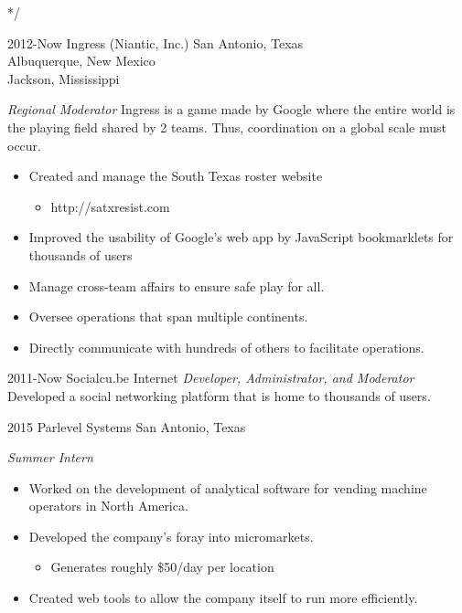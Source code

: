 \documentclass[]{friggeri-cv} %
\begin{document}
*/ 


\begin{entrylist}

\entry
{2012-Now}
{Ingress (Niantic, Inc.)}
{San Antonio, Texas \\ Albuquerque, New Mexico \\ Jackson, Mississippi}
{\emph{Regional Moderator}
Ingress is a game made by Google where the entire world is the playing field shared by 2 teams. Thus, coordination on a global scale must occur. 
	\begin{itemize}
	\item Created and manage the South Texas roster website 
	\begin{itemize}
		\item http://satxresist.com 
	\end{itemize}
	\item Improved the usability of Google's web app by JavaScript bookmarklets for thousands of users 
	\item Manage cross-team affairs to ensure safe play for all. 
	\item Oversee operations that span multiple continents. 
	\item Directly communicate with hundreds of others to facilitate operations. 
	\end{itemize}
	}


\entry
{2011-Now}
{Socialcu.be}
{Internet}
{\emph{Developer, Administrator, and Moderator} \\
Developed a social networking platform that is home to thousands of users.}


\entry
{2015}
{Parlevel Systems}
{San Antonio, Texas}
{\emph{Summer Intern} 
	\begin{itemize}
	\item Worked on the development of analytical software for vending machine operators in North America. 
	\item Developed the company's foray into micromarkets. 
	\begin{itemize}
		\item Generates roughly \$50/day per location 
	\end{itemize}
	\item Created web tools to allow the company itself to run more efficiently.
	\end{itemize}
	}


\end{entrylist}
\end{document}
